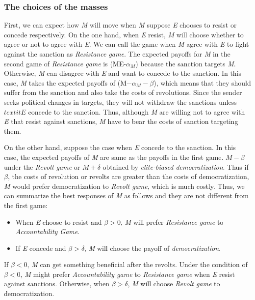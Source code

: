 \documentclass[11pt]{article}
\begin{document}
\subsubsection*{The choices of the masses}
	
First, we can expect how \textit{M} will move when \textit{M} suppose \textit{E} chooses to resist or concede respectively. On the one hand, when \textit{E} resist, \textit{M} will choose whether to agree or not to agree with \textit{E}. We can call the game when \textit{M} agree with \textit{E} to fight against the sanction as \textit{Resistance game}. The expected payoffs for \textit{M} in the second game of \textit{Resistance game} is (ME-$\alpha_{M}$) because the sanction targets \textit{M}. Otherwise, \textit{M} can disagree with \textit{E} and want to concede to the sanction. In this case, \textit{M} takes the expected payoffs of (M$-\alpha_{M}-\beta$), which means that they should suffer from the sanction and also take the costs of revolutions. Since the sender seeks political changes in targets, they will not withdraw the sanctions unless $textit{E}$ concede to the sanction. Thus, although \textit{M} are willing not to agree with \textit{E} that resist against sanctions, \textit{M} have to bear the costs of sanction targeting them.
	
On the other hand, suppose the case when \textit{E} concede to the sanction. In this case, the expected payoffs of \textit{M} are same as the payoffs in the first game. $M-\beta$ under the \textit{Revolt game} or $M + \delta$ obtained by \textit{elite-biased democratization}. Thus if $\beta$, the costs of revolution or revolts are greater than the costs of democratization, \textit{M} would prefer democratization to \textit{Revolt game}, which is much costly. Thus, we can summarize the best responses of \textit{M} as follows and they are not different from the first game:
	
\begin{itemize}
	\item When \textit{E} choose to resist and $\beta > 0$, \textit{M} will prefer \textit{Resistance game} to \textit{Accountability Game}.
	\item If \textit{E} concede and $\beta > \delta$, \textit{M} will choose the payoff of \textit{democratization}.
\end{itemize}
	
If $\beta < 0$, \textit{M} can get something beneficial after the revolts. Under the condition of $\beta < 0$, \textit{M} might prefer \textit{Accountability game} to \textit{Resistance game} when \textit{E} resist against sanctions. Otherwise, when $\beta > \delta$, \textit{M} will choose \textit{Revolt game} to democratization. 
\end{document}
